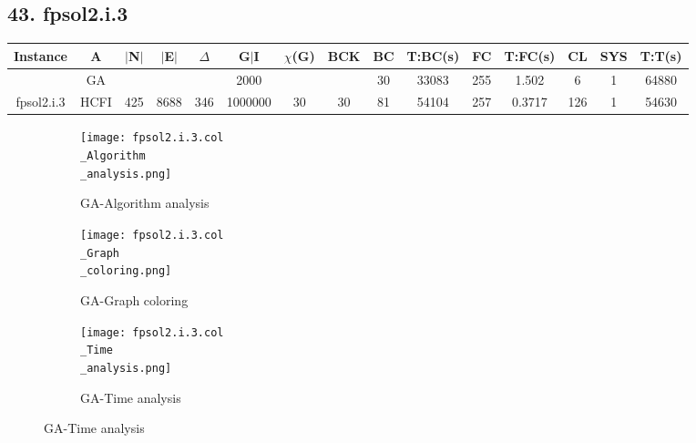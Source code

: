 \documentclass[10pt]{article}
\begin{document}
\subsection*{\hspace{0,9073976cm} 43. fpsol2.i.3 }
\begin{table}[H]
\centering
\begin{tabular}{|c|c|c|c|c|c|c|c|c|c|c|c|c|c|c|}
\hline
Instance& A &$|$N$|$ & $|$E$|$ & $\Delta$ & G$|$I & $\chi$(G) &BCK&BC & T:BC(s) & FC & T:FC(s) & CL & SYS & T:T(s) \\ \hline \hline

		&GA&       &                   &                     &   2000      &     \cellcolor{yellow} & {\cellcolor{yellow}}& {{\cellcolor{green}30}}
&33083   &255        &1.502                   &6                    &1          &64880        \\ \cline{2-2} \cline{6-6} \cline{9-15}
 \multirow{-2}{*}{fpsol2.i.3} &HCFI   &\multirow{-2}{*}{425}   &\multirow{-2}{*}{8688}     &\multirow{-2}{*}{346}     &1000000      &\multirow{-2}{*}{\cellcolor{yellow}30}      & \multirow{-2}{*}{\cellcolor{yellow}30}    &{\cellcolor{green}81}     & 54104        &257    &0.3717          &126    &1     &54630        \\ \hline
\end{tabular}
\end{table}
\graphicspath{{./Core1/Solutions/GA/fpsol2.i.3.col}}
\begin{figure}[H]
\begin{subfigure}{.33\textwidth}
  \centering
  \texttt{[image: fpsol2.i.3.col\\\_Algorithm\\\_analysis.png]}
  \caption{GA-Algorithm analysis}
   \label{fig:subfig1}
\end{subfigure}%
\begin{subfigure}{.33\textwidth}
  \centering
  \texttt{[image: fpsol2.i.3.col\\\_Graph\\\_coloring.png]}
  \caption{GA-Graph coloring}
  \label{fig:subfig2}
\end{subfigure}
\begin{subfigure}{.33\textwidth}
  \centering
  \texttt{[image: fpsol2.i.3.col\\\_Time\\\_analysis.png]}
  \caption{GA-Time analysis}
  \end{subfigure}
\end{figure}
\end{document}

